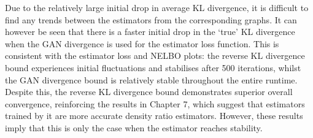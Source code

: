 \documentclass[honours,12pt]{unswthesis}
\numberwithin{equation}{section}
\theoremstyle{definition}
\begin{document}
Due to the relatively large initial drop in average KL divergence, it is difficult to find any trends between the estimators from the corresponding graphs. It can however be seen that there is a faster initial drop in the `true' KL divergence when the GAN divergence is used for the estimator loss function. This is consistent with the estimator loss and NELBO plots: the reverse KL divergence bound experiences initial fluctuations and stabilises after 500 iterations, whilst the GAN divergence bound is relatively stable throughout the entire runtime. Despite this, the reverse KL divergence bound demonstrates superior overall convergence, reinforcing the results in Chapter 7, which suggest that estimators trained by it are more accurate density ratio estimators. However, these results imply that this is only the case when the estimator reaches stability.
\end{document}
